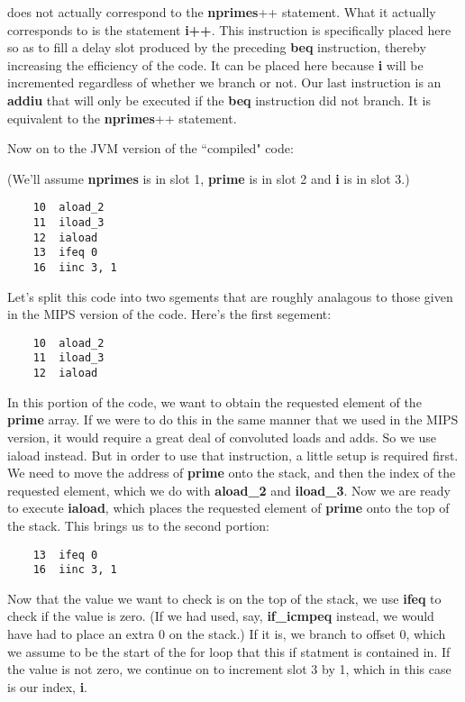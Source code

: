 \documentclass[11pt]{article}
\begin{document}
does not actually correspond to the \textbf{nprimes}++ statement. What it actually corresponds to is the statement \textbf{i++}. This instruction is specifically placed here so as to fill a delay slot produced by the preceding \textbf{beq} instruction, thereby increasing the efficiency of the code. It can be placed here because \textbf{i} will be incremented regardless of whether we branch or not. Our last instruction is an \textbf{addiu} that will only be executed if the \textbf{beq} instruction did not branch. It is equivalent to the \textbf{nprimes}++ statement.


Now on to the JVM version of the ``compiled" code:

(We'll assume \textbf{nprimes} is in slot 1, \textbf{prime} is in slot 2 and \textbf{i} is in slot 3.)

\begin{verbatim}
    10  aload_2
    11  iload_3
    12  iaload
    13  ifeq 0
    16  iinc 3, 1
\end{verbatim}

Let's split this code into two sgements that are roughly analagous to those given in the MIPS version of the code. Here's the first segement:

\begin{verbatim}
    10  aload_2
    11  iload_3
    12  iaload
\end{verbatim}

In this portion of the code, we want to obtain the requested element of the \textbf{prime} array. If we were to do this in the same manner that we used in the MIPS version, it would require a great deal of convoluted loads and adds. So we use iaload instead. But in order to use that instruction, a little setup is required first. We need to move the address of \textbf{prime} onto the stack, and then the index of the requested element, which we do with \textbf{aload\_2} and \textbf{iload\_3}. Now we are ready to execute \textbf{iaload}, which places the requested element of \textbf{prime} onto the top of the stack. This brings us to the second portion:

\begin{verbatim}
    13  ifeq 0
    16  iinc 3, 1
\end{verbatim}

Now that the value we want to check is on the top of the stack, we use \textbf{ifeq} to check if the value is zero. (If we had used, say, \textbf{if\_icmpeq} instead, we would have had to place an extra 0 on the stack.) If it is, we branch to offset 0, which we assume to be the start of the for loop that this if statment is contained in. If the value is not zero, we continue on to increment slot 3 by 1, which in this case is our index, \textbf{i}.
\end{document}
